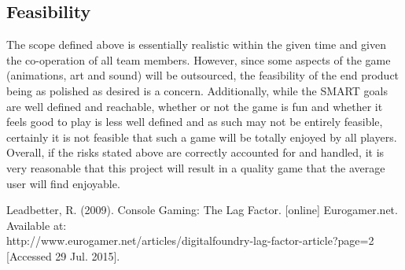 \documentclass[a4paper,10pt]{article}
\begin{document}
\subsection{Feasibility}
The scope defined above is essentially realistic within the given time and given the co-operation of all team members. However, since some aspects of the game (animations, art and sound) will be outsourced, the feasibility of the end product being as polished as desired is a concern. Additionally, while the SMART goals are well defined and reachable, whether or not the game is fun and whether it feels good to play is less well defined and as such may not be entirely feasible, certainly it is not feasible that such a game will be totally enjoyed by all players.
\newline
 Overall, if the risks stated above are correctly accounted for and handled, it is very reasonable that this project will result in a quality game that the average user will find enjoyable.
\newpage
\begin{thebibliography}{9} 
	 Leadbetter, R. (2009). Console Gaming: The Lag Factor. [online] Eurogamer.net. Available at: \\http://www.eurogamer.net/articles/digitalfoundry-lag-factor-article?page=2 [Accessed 29 Jul. 2015]. 
\end{thebibliography}
\end{document}
